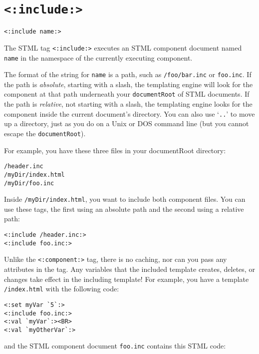 \documentclass{manual}
\begin{document}
\section{\texttt{<:include:>}}
\label{taginclude}

\begin{verbatim}<:include name:>\end{verbatim}

The STML tag \texttt{<:include:>} executes an
STML component document named \texttt{name}
in the namespace of the currently executing component.

The format of the string for \texttt{name} is a path, such as
\texttt{/foo/bar.inc} or \texttt{foo.inc}. If the path is
\emph{absolute}, starting with a slash, the templating engine will
look for the component at that path underneath your
\texttt{documentRoot} of STML documents. If the path is
\emph{relative}, not starting with a slash, the templating engine
looks for the component inside the current document's directory. You
can also use `\texttt{..}' to move up a directory, just as you do on a
Unix or DOS command line (but you cannot escape the
\texttt{documentRoot}).

For example, you have these three files in your 
documentRoot directory:

\begin{verbatim}/header.inc
/myDir/index.html
/myDir/foo.inc
\end{verbatim}

Inside \texttt{/myDir/index.html}, you want to include both
component files. You can use these tags, the first using an absolute
path and the second using a relative path:

\begin{verbatim}<:include /header.inc:>
<:include foo.inc:>
\end{verbatim}

Unlike the \texttt{<:component:>} 
tag, there is no caching, nor can you pass any attributes 
in the tag. Any variables that the included template creates, 
deletes, or changes take effect in the including template! 
For example, you have a template \texttt{/index.html} with 
the following code:

\begin{verbatim}<:set myVar `5`:>
<:include foo.inc:>
<:val `myVar`:><BR>
<:val `myOtherVar`:>
\end{verbatim}

and the STML component document \texttt{foo.inc} 
contains this STML code:
\end{document}

